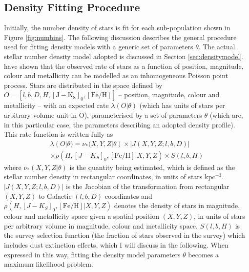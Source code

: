  \subsection{Density Fitting Procedure}
\label{sec:densfit}
Initially, the number density of stars is fit for each sub-population shown in Figure \ref{fig:numbins}. The following discussion describes the general procedure used for fitting density models with a generic set of parameters $\theta$. The actual stellar number density model adopted is discussed in Section \ref{sec:densitymodel}. \citet{2016ApJ...823...30B,2012ApJ...753..148B,2013A&ARv..21...61R} have shown that the observed rate of stars as a function of position, magnitude, colour and metallicity can be modelled as an inhomogeneous Poisson point process. Stars are distributed in the space defined by $O = [l,b,D,H,\mathrm{[J-K_S]_0}, \mathrm{[Fe/H]}]$ -- position, magnitude, colour and metallicity -- with an expected rate $\lambda(O|\theta)$ (which has units of stars per arbitrary volume unit in O), parameterised by a set of parameters $\theta$ (which are, in this particular case, the parameters describing an adopted density profile). This rate function is written fully as
 \begin{multline}
 \lambda(O|\theta) = \nu_*(X,Y,Z|\theta) \times |J(X,Y,Z;l,b,D)| \\ \times \rho(H, [J-K_S]_0, \mathrm{[Fe/H]}|X,Y,Z) \times S(l,b,H) 
 \label{eq:rate}
 \end{multline}
 where $\nu_*(X,Y,Z|\theta)$ is the quantity being estimated, which is defined as the stellar number density in rectangular coordinates, in units of stars kpc$^{-3}$. $ |J(X,Y,Z;l,b,D)|$ is the Jacobian of the transformation from rectangular $(X,Y,Z)$ to Galactic $(l,b,D)$ coordinates and $ \rho(H, [J-K_S]_0, \mathrm{[Fe/H]}|X,Y,Z) $ denotes the density of stars in magnitude, colour and metallicity space given a spatial position $(X,Y,Z)$, in units of stars per arbitrary volume in magnitude, colour and metallicity space. $S(l,b,H)$ is the survey selection function (the fraction of stars observed in the survey) which includes dust extinction effects, which I will discuss in the following. When expressed in this way, fitting the density model parameters $\theta$ becomes a maximum likelihood problem.

